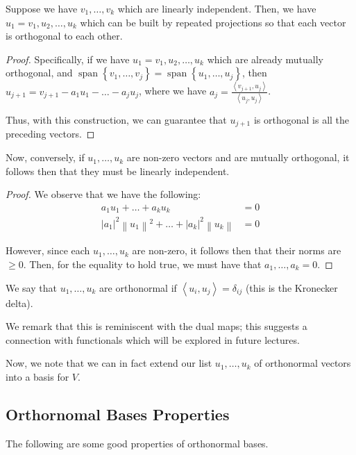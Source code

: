 \documentclass[openany]{book}
\newcommand{\norm}[1]{\left\lVert{#1}\right\rVert}
\DeclareMathOperator*{\vspan}{span}
\newcommand{\innerproduct}[2]{\left\langle{#1}, {#2}\right\rangle}
\begin{document}
\begin{thm}
	Suppose we have $v_{1}, \ldots, v_{k}$ which are linearly independent. Then, we have $u_{1} = v_{1}, u_{2}, \ldots, u_{k}$ which can be built by repeated projections so that each vector is orthogonal to each other.
\end{thm}
\begin{proof}
	Specifically, if we have $u_{1} = v_{1}, u_{2}, \ldots, u_{k}$ which are already mutually orthogonal, and $\vspan\left\{  v_{1}, \ldots, v_{j} \right\} = \vspan\left\{  u_{1}, \ldots, u_{j} \right\}$, then $u_{j+1} = v_{j+1} - a_{1}u_{1} - \ldots - a_{j}u_{j}$, where we have $a_{j} = \frac{\innerproduct{v_{j+1}}{u_{j}}}{\innerproduct{u_{j}}{u_{j}}}$.

Thus, with this construction, we can guarantee that $u_{j+1}$ is orthogonal is all the preceding vectors.

\end{proof}
\begin{thm}
	Now, conversely, if $u_{1}, \ldots, u_{k}$ are non-zero vectors and are mutually orthogonal, it follows then that they must be linearly independent.
\end{thm}
\begin{proof}
	We observe that we have the following:
	\begin{align*}
		a_{1}u_{1} + \ldots + a_{k}u_{k}&= 0 \\
		\lvert a_{1} \rvert^{2} \norm{u_{1}}^{2} + \ldots + \lvert a_{k} \rvert^{2}\norm{u_{k}} &= 0
	\end{align*}

	However, since each $u_{1}, \ldots, u_{k}$ are non-zero, it follows then that their norms are $\geq 0$. Then, for the equality to hold true, we must have that $a_{1}, \ldots, a_{k} = 0$.
\end{proof}

\begin{defn}
	We say that $u_{1}, \ldots, u_{k}$ are orthonormal if $\innerproduct{u_{i}}{u_{j}} = \delta_{ij}$ (this is the Kronecker delta).
\end{defn}
\begin{rmk}
	We remark that this is reminiscent with the dual maps; this suggests a connection with functionals which will be explored in future lectures.
\end{rmk}

Now, we note that we can in fact extend our list $u_{1}, \ldots, u_{k}$ of orthonormal vectors into a basis for $V$.

\subsection{Orthornomal Bases Properties}
The following are some good properties of orthonormal bases.
\end{document}
